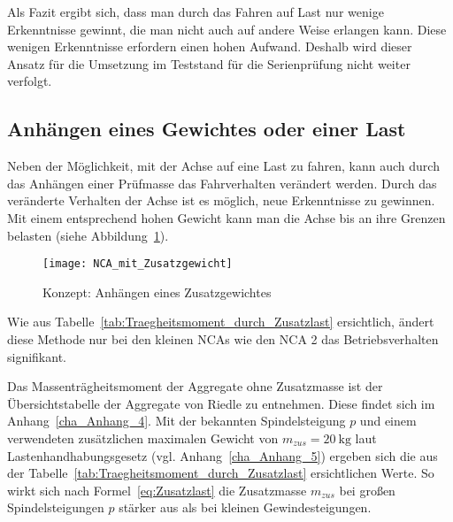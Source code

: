 Als Fazit ergibt sich, dass man durch das Fahren auf Last nur wenige Erkenntnisse gewinnt, die man nicht auch auf andere Weise erlangen kann. Diese wenigen Erkenntnisse erfordern einen hohen Aufwand. Deshalb wird dieser Ansatz für die Umsetzung im Teststand für die Serienprüfung nicht weiter verfolgt.



\subsection{Anhängen eines Gewichtes oder einer Last}

Neben der Möglichkeit, mit der Achse auf eine Last zu fahren, kann auch durch das Anhängen einer Prüfmasse das Fahrverhalten verändert werden. Durch das veränderte Verhalten der Achse ist es möglich, neue Erkenntnisse zu gewinnen. Mit einem entsprechend hohen Gewicht kann man die Achse bis an ihre Grenzen belasten (siehe Abbildung~\ref{fig:NCA_mit_Zusatzgewicht}).

\begin{figure}[h]
\centering
\texttt{[image: NCA\_mit\_Zusatzgewicht]} 
\caption{Konzept: Anhängen eines Zusatzgewichtes} 
\label{fig:NCA_mit_Zusatzgewicht}
\end{figure}



Wie aus Tabelle~\ref{tab:Traegheitsmoment_durch_Zusatzlast} ersichtlich, ändert diese Methode nur bei den kleinen NCAs wie den NCA 2 das Betriebsverhalten signifikant.


Das Massenträgheitsmoment der Aggregate ohne Zusatzmasse ist der Übersichtstabelle der Aggregate von Riedle \cite{Riedle2015} zu entnehmen. Diese findet sich im Anhang~\ref{cha_Anhang_4}. Mit der bekannten Spindelsteigung $p$ und einem verwendeten zusätzlichen maximalen Gewicht von $m_{zus} = \SI{20}{\kilogram}$ laut Lastenhandhabungsgesetz (vgl. Anhang~\ref{cha_Anhang_5}) ergeben sich die aus der Tabelle~\ref{tab:Traegheitsmoment_durch_Zusatzlast} ersichtlichen Werte. So wirkt sich nach Formel~\ref{eq:Zusatzlast} die Zusatzmasse $m_{zus}$ bei großen Spindelsteigungen $p$ stärker aus als bei kleinen Gewindesteigungen.


